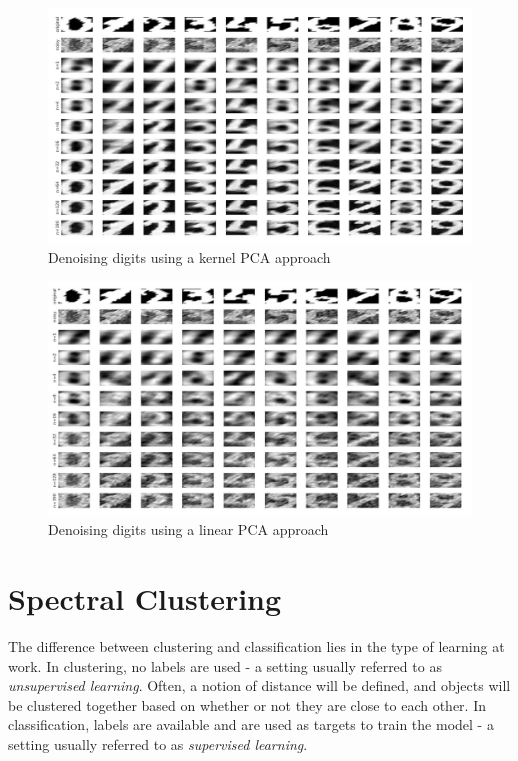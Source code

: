 \documentclass[11pt, a4paper]{article}
\begin{document}
\begin{figure}[H]
  \centering
  \includegraphics[scale=.24]{digitsn_kernelpca.jpg}
  \caption{Denoising digits using a kernel PCA approach}
  \label{fig:digitsn_kernelpca}
\end{figure}

\begin{figure}[H]
  \centering
  \includegraphics[scale=.24]{digitsn_linearpca.jpg}
  \caption{Denoising digits using a linear PCA approach}
  \label{fig:digitsn_linearpca}
\end{figure}

\section{Spectral Clustering}

The difference between clustering and classification lies in the type
of learning at work. In clustering, no labels are used - a setting
usually referred to as \emph{unsupervised learning}. Often, a notion
of distance will be defined, and objects will be clustered together
based on whether or not they are close to each other. In
classification, labels are available and are used as targets to train
the model - a setting usually referred to as \emph{supervised
  learning}.
\end{document}
